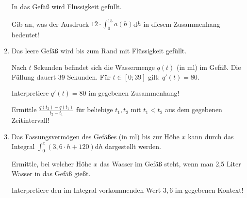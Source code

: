 \begin{langesbeispiel}
\begin{enumerate}
	In das Gefäß wird Flüssigkeit gefüllt.
	
	Gib an, was der Ausdruck $12\cdot\int^15_0{a(h)}$d$h$ in diesem Zusammenhang bedeutet!
\item Das leere Gefäß wird bis zum Rand mit Flüssigkeit gefüllt.

Nach $t$ Sekunden befindet sich die Wassermenge $q(t)$ (in ml) im Gefäß. Die Füllung dauert 39 Sekunden. Für $t\in[0;39]$ gilt: $q'(t)=80$.

Interpretiere $q'(t)=80$ im gegebenen Zusammenhang!

Ermittle $\frac{q(t_2)-q(t_1)}{t_2-t_1}$ für beliebige $t_1,t_2$ mit $t_1<t_2$ aus dem gegebenen Zeitintervall!
\item Das Fassungsvermögen des Gefäßes (in ml) bis zur Höhe $x$ kann durch das Integral $\int^x_0{(3,6\cdot h+120)}$d$h$ dargestellt werden.

Ermittle, bei welcher Höhe $x$ das Wasser im Gefäß steht, wenn man 2,5 Liter Wasser in das Gefäß gießt.

Interpretiere den im Integral vorkommenden Wert $3,6$ im gegebenen Kontext!
						\end{enumerate}\leer
				
\end{langesbeispiel}
